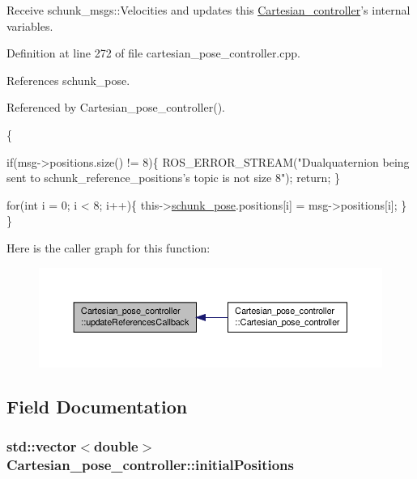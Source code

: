 Receive schunk\-\_\-msgs\-::\-Velocities and updates this \hyperlink{classCartesian__controller}{Cartesian\-\_\-controller}'s internal variables. 



Definition at line 272 of file cartesian\-\_\-pose\-\_\-controller.\-cpp.



References schunk\-\_\-pose.



Referenced by Cartesian\-\_\-pose\-\_\-controller().


\begin{DoxyCode}
                                                                               
                      \{

        \textcolor{keywordflow}{if}(msg->positions.size() != 8)\{
                ROS\_ERROR\_STREAM(\textcolor{stringliteral}{"Dualquaternion being sent to
       schunk\_reference\_positions's topic is not size 8"});
                \textcolor{keywordflow}{return};
        \}

        \textcolor{keywordflow}{for}(\textcolor{keywordtype}{int} i = 0; i < 8; i++)\{
                this->\hyperlink{classCartesian__pose__controller_a301bc44e901e4837cf036661478354c4}{schunk\_pose}.positions[i] = msg->positions[i];
        \}
\}
\end{DoxyCode}


Here is the caller graph for this function\-:\nopagebreak
\begin{figure}[H]
\begin{center}
\leavevmode
\includegraphics[width=350pt]{classCartesian__pose__controller_af9c1ec1f565375f50f8a15b16464f94d_icgraph}
\end{center}
\end{figure}




\subsection{Field Documentation}
\hypertarget{classCartesian__pose__controller_a42433d7f2e4e03ccaac56e1f9a7a5027}{
\subsubsection[{initial\-Positions}]{\setlength{\rightskip}{0pt plus 5cm}std\-::vector$<$double$>$ Cartesian\-\_\-pose\-\_\-controller\-::initial\-Positions\hspace{0.3cm}{\ttfamily [private]}}}\label{classCartesian__pose__controller_a42433d7f2e4e03ccaac56e1f9a7a5027}


